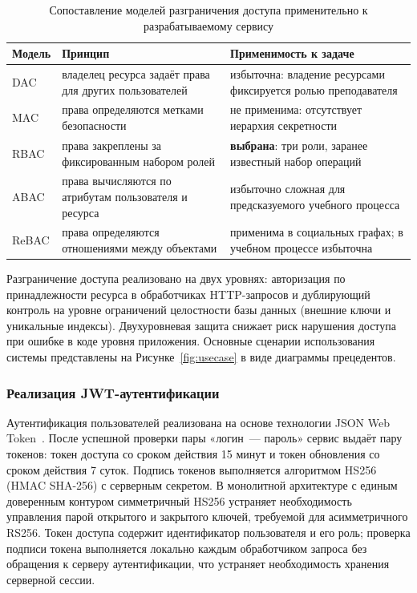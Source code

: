 \begin{table}[!htb]
\fontsize{11pt}{13pt}\selectfont
\centering
\caption{Сопоставление моделей разграничения доступа применительно к разрабатываемому сервису}
\label{tab:access-models}
\smallskip
\begin{tabular}{|l|p{5.5cm}|p{4.8cm}|}
    \hline
    \textbf{Модель} & \textbf{Принцип} & \textbf{Применимость к задаче} \\
    \hline
        DAC  & владелец ресурса задаёт права для других пользователей & избыточна: владение ресурсами фиксируется ролью преподавателя \\
    \hline
        MAC  & права определяются метками безопасности & не применима: отсутствует иерархия секретности \\
    \hline
        RBAC & права закреплены за фиксированным набором ролей & \textbf{выбрана}: три роли, заранее известный набор операций \\
    \hline
        ABAC & права вычисляются по атрибутам пользователя и ресурса & избыточно сложная для предсказуемого учебного процесса \\
    \hline
        ReBAC & права определяются отношениями между объектами & применима в социальных графах; в учебном процессе избыточна \\
    \hline
\end{tabular}
\end{table}
\FloatBarrier

Разграничение доступа реализовано на двух уровнях: авторизация
по принадлежности ресурса в обработчиках HTTP-запросов
и дублирующий контроль на уровне ограничений целостности базы
данных (внешние ключи и уникальные индексы). Двухуровневая защита
снижает риск нарушения доступа при ошибке в коде уровня приложения.
Основные сценарии использования системы представлены
на Рисунке~\ref{fig:usecase} в виде диаграммы прецедентов.


\subsubsection{Реализация JWT-аутентификации}

Аутентификация пользователей реализована на основе технологии
JSON Web Token~\cite{rfc7519}. После успешной проверки пары
«логин~--- пароль» сервис выдаёт пару токенов: токен доступа
со сроком действия 15 минут и токен обновления со сроком действия
7 суток. Подпись токенов выполняется алгоритмом HS256 (HMAC SHA-256)
с серверным секретом. В монолитной архитектуре с единым доверенным
контуром симметричный HS256 устраняет необходимость управления
парой открытого и закрытого ключей, требуемой для асимметричного
RS256. Токен
доступа содержит идентификатор пользователя и его роль; проверка
подписи токена выполняется локально каждым обработчиком запроса
без обращения к серверу аутентификации, что устраняет необходимость
хранения серверной сессии.

